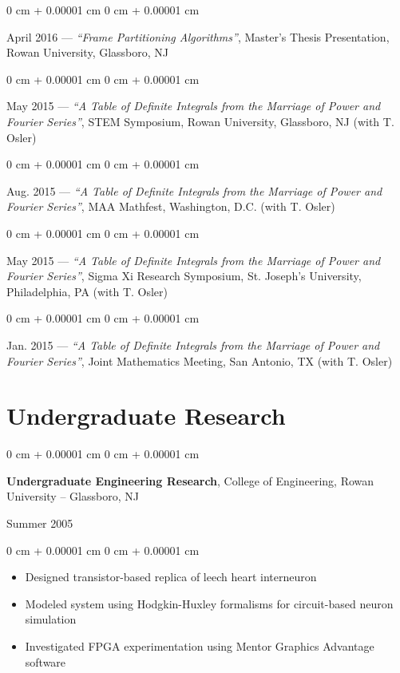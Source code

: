 \documentclass[10pt, letterpaper]{article}
\newenvironment{highlights}{
    \begin{itemize}[
        topsep=0.10 cm,
        parsep=0.10 cm,
        partopsep=0pt,
        itemsep=0pt,
        leftmargin=0 cm + 10pt
    ]
}{
    \end{itemize}
} %
\newenvironment{onecolentry}{
    \begin{adjustwidth}{
        0 cm + 0.00001 cm
    }{
        0 cm + 0.00001 cm
    }
}{
    \end{adjustwidth}
} %
\newenvironment{twocolentry}[2][]{
    \onecolentry
    \def\secondColumn{#2}
    \setcolumnwidth{\fill, 4.5 cm}
    \begin{paracol}{2}
}{
    \switchcolumn \raggedleft \secondColumn
    \end{paracol}
    \endonecolentry
} %
\begin{document}
\begin{onecolentry}
    April 2016 — \textit{“Frame Partitioning Algorithms”}, Master’s Thesis Presentation, Rowan University, Glassboro, NJ
\end{onecolentry}

\begin{onecolentry}
    May 2015 — \textit{“A Table of Definite Integrals from the Marriage of Power and Fourier Series”}, STEM Symposium, Rowan University, Glassboro, NJ (with T. Osler)
\end{onecolentry}

\begin{onecolentry}
    Aug. 2015 — \textit{“A Table of Definite Integrals from the Marriage of Power and Fourier Series”}, MAA Mathfest, Washington, D.C. (with T. Osler)
\end{onecolentry}

\begin{onecolentry}
    May 2015 — \textit{“A Table of Definite Integrals from the Marriage of Power and Fourier Series”}, Sigma Xi Research Symposium, St. Joseph’s University, Philadelphia, PA (with T. Osler)
\end{onecolentry}

\begin{onecolentry}
    Jan. 2015 — \textit{“A Table of Definite Integrals from the Marriage of Power and Fourier Series”}, Joint Mathematics Meeting, San Antonio, TX (with T. Osler)
\end{onecolentry}

\section{Undergraduate Research}

\begin{twocolentry}{
    Summer 2005
}
    \textbf{Undergraduate Engineering Research}, College of Engineering, Rowan University -- Glassboro, NJ
\end{twocolentry}

\vspace{0.10 cm}
\begin{onecolentry}
    \begin{highlights}
        \item Designed transistor-based replica of leech heart interneuron
        \item Modeled system using Hodgkin-Huxley formalisms for circuit-based neuron simulation
        \item Investigated FPGA experimentation using Mentor Graphics Advantage software
    \end{highlights}
\end{onecolentry}
\end{document}
